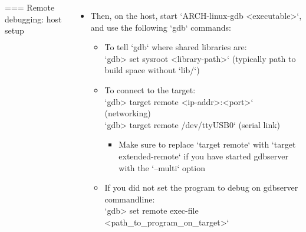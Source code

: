 \begin{columns}[T]
=== Remote debugging: host setup
  \begin{itemize}
  \item Then, on the host, start `ARCH-linux-gdb <executable>`,\\
    and use the following `gdb` commands:
    \begin{itemize}
    \item To tell `gdb` where shared libraries are:\\
      `gdb> set sysroot <library-path>` (typically path to build space without `lib/`)
    \item To connect to the target:\\
      `gdb> target remote <ip-addr>:<port>` (networking)\\
      `gdb> target remote /dev/ttyUSB0` (serial link)\\
      \begin{itemize}
        \item Make sure to replace `target remote` with `target
      extended-remote` if you have started gdbserver with the `--multi`
      option
      \end{itemize}
    \item If you did not set the program to debug on gdbserver commandline:\\
      `gdb> set remote exec-file <path_to_program_on_target>`
    \end{itemize}
  \end{itemize}



\end{columns}
